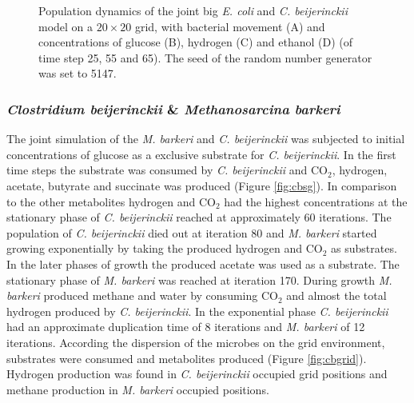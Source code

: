 \begin{figure}[h!]
{\begin{minipage}[t]{0.3\textwidth}
  \end{minipage}
  }
  \caption{Population dynamics of the joint big \emph{E. coli} and \emph{C. beijerinckii} model on a $20\times20$ grid, with bacterial movement (A) and concentrations of glucose (B), hydrogen (C) and ethanol (D) (of time step 25, 55 and 65). The seed of the random number generator was set to 5147.}
  \label{fig:cegrid}
\end{figure}

\subsubsection{\textit{Clostridium beijerinckii} \& \textit{Methanosarcina barkeri}}
The joint simulation of the \textit{M. barkeri} and \textit{C. beijerinckii} was subjected to initial concentrations of glucose as a exclusive substrate for \textit{C. beijerinckii}. In the first time steps the substrate was consumed by \textit{C. beijerinckii} and CO$_2$, hydrogen, acetate, butyrate and succinate was produced (Figure \hyperref[fig:cbsg]{\ref{fig:cbsg}}). 
In comparison to the other metabolites hydrogen and CO$_2$ had the highest concentrations at the stationary phase of \textit{C. beijerinckii} reached at approximately 60 iterations. The population of \textit{C. beijerinckii} died out at iteration 80 and \textit{M. barkeri} started growing exponentially by taking the produced hydrogen and CO$_2$ as substrates. 
In the later phases of growth the produced acetate was used as a substrate. The stationary phase of \textit{M. barkeri} was reached at iteration 170. 
During growth \textit{M. barkeri} produced methane and water by consuming CO$_2$ and almost the total hydrogen produced by \textit{C. beijerinckii}. 
In the exponential phase \textit{C. beijerinckii} had an approximate duplication time of 8 iterations and \textit{M. barkeri} of 12 iterations.
According the dispersion of the microbes on the grid environment, substrates were consumed and metabolites produced (Figure \hyperref[fig:cbgrid]{\ref{fig:cbgrid}}). Hydrogen production was found in \textit{C. beijerinckii} occupied grid positions and methane production in \textit{M. barkeri} occupied positions.
